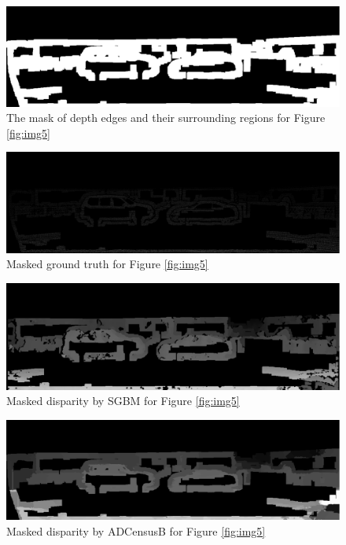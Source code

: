 \begin{figure}[H]
\centering
\includegraphics[width=\linewidth, scale=0.48]{5msk}
\caption{The mask of depth edges and their surrounding regions for Figure \protect\ref{fig:img5}}
\label{fig:msk}
\end{figure} 
\begin{figure}[H]
\centering
\includegraphics[width=\linewidth, scale=0.48]{5gt}
\caption{Masked ground truth for Figure \protect\ref{fig:img5}}
\label{fig:gtmsk}
\end{figure} 
\begin{figure}[H]
\centering
\includegraphics[width=\linewidth, scale=0.48]{5mdispsgb}
\caption{Masked disparity by SGBM for Figure \protect\ref{fig:img5}}
\label{fig:5mdispsgb}
\end{figure} 
\begin{figure}[H]
\centering
\includegraphics[width=\linewidth,scale=0.48]{5mdispadc}
\caption{Masked disparity by ADCensusB for Figure \protect\ref{fig:img5}}
\label{fig:5mdispadc}
\end{figure} 

